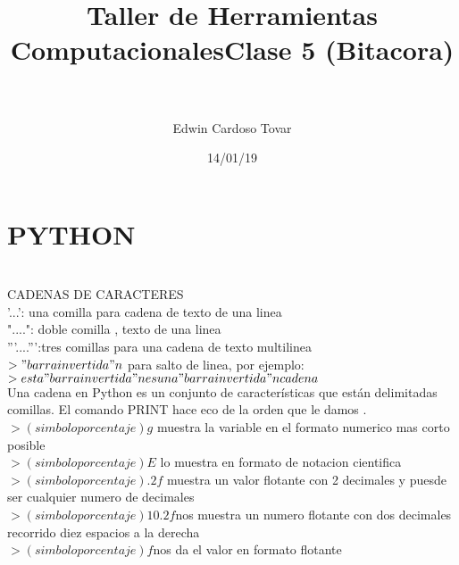 \documentclass[letterpaper, 12pt, oneside]{article}%
\title{\Huge Taller de Herramientas Computacionales}
\author{Edwin Cardoso Tovar}%
\date{14/01/19}%
\begin{document}
	\maketitle
	\begin{center}%
	\end{center}%
	\newpage%
	
	\title{\textbf{\Huge Clase 5 (Bitacora)\\} \\}%
	
	\section*{PYTHON}\\
	
	CADENAS DE CARACTERES\\
	'...': una comilla para cadena de texto de una linea\\
	"....": doble comilla , texto de una linea\\
	'''....''':tres comillas para una cadena de texto multilinea\\
	$>"barra invertida"n $ para salto de linea, por ejemplo:\\
	$> esta "barra invertida"n es una "barra invertida"n cadena$\\
	Una cadena en Python es un conjunto de características que están delimitadas comillas.
	El comando PRINT hace eco de la orden que le damos .
	$>(simbolo porcentaje)g$ muestra la variable en el formato numerico mas corto posible\\
	$>(simbolo porcentaje)E$ lo muestra en formato de notacion cientifica
	$>(simbolo porcentaje).2f$ muestra un valor flotante con 2 decimales y puesde ser cualquier numero de decimales\\
	$>(simbolo porcentaje)10.2f$nos muestra un numero flotante con dos decimales recorrido diez espacios a la derecha\\
	$>(simbolo porcentaje)f$nos da el valor en formato flotante\\
	
	
	
	
	
	

	
	
	
	
	
	
	
	
\end{document}
